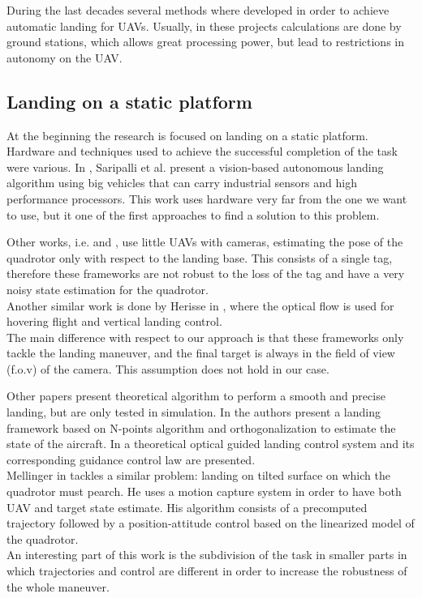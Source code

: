 During the last decades several methods where developed in order to achieve automatic landing for UAVs.
Usually, in these projects calculations are done by ground stations, which allows great processing power, but lead to restrictions in autonomy on the UAV. \\

\subsection{Landing on a static platform}
At the beginning the research is focused on landing on a static platform. \\
Hardware and techniques used to achieve the successful completion of the task were various. In \cite{saripalli2002vision}, Saripalli et al. present a vision-based autonomous landing algorithm using big vehicles that can carry industrial sensors and high performance processors. This work uses hardware very far from the one we want to use, but it one of the first approaches to find a solution to this problem.

Other works, i.e.  \cite{sharp2001vision} and \cite{lange2008autonomous}, use little UAVs with cameras, estimating the pose of the quadrotor only with respect to the landing base. This consists of a single tag, therefore these frameworks are not robust to the loss of the tag and have a very noisy state estimation for the quadrotor.\\ 
Another similar work is done by Herisse in \cite{herisse2008hovering}, where the optical flow is used for hovering flight and vertical landing control.\\
The main difference with respect to our approach is that these frameworks only tackle the landing maneuver, and the final target is always in the field of view (f.o.v) of the camera. This assumption does not hold in our case.

Other papers present theoretical algorithm to perform a smooth and precise landing, but are only tested in simulation. In \cite{tang2011uav} the authors present a landing framework based on N-points algorithm and orthogonalization to estimate the state of the aircraft. In \cite{jian2012automatic} a theoretical optical guided landing control system and its corresponding guidance control law are presented.\\

Mellinger in \cite{mellinger2010control} tackles a similar problem: landing on tilted surface on which the quadrotor must pearch. He uses a motion capture system in order to have both UAV and target state estimate. His algorithm consists 
of a precomputed trajectory followed by a position-attitude control based on the linearized model of the quadrotor.\\
An interesting part of this work is the subdivision of the task in smaller parts in which trajectories and control are different in order to increase the robustness of the whole maneuver.

